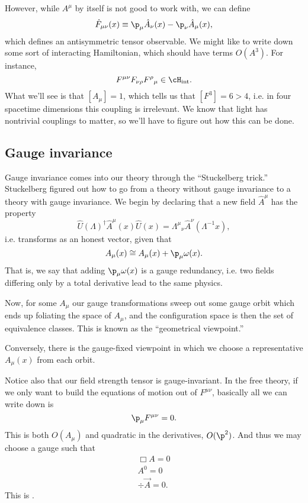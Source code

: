 However, while $A^\mu$ by itself is not good to work with, we can define
\begin{equation}
    \hat F_{\mu\nu}(x) \equiv \p_\mu \hat A_\nu(x) -\p_\nu \hat A_\mu(x),
\end{equation}
which defines an antisymmetric tensor observable. We might like to write down some sort of interacting Hamiltonian, which should have terms $O(A^3)$. For instance,
\begin{equation}
    F^{\mu\nu}F_{\nu\rho} F^\rho{}_\mu \in \cH_\text{int}.
\end{equation}
What we'll see is that $[A_\mu]=1$, which tells us that $[F^3]=6 >4$, i.e. in four spacetime dimensions this coupling is irrelevant. We know that light has nontrivial couplings to matter, so we'll have to figure out how this can be done.

\subsection*{Gauge invariance}
Gauge invariance comes into our theory through the ``Stuckelberg trick.'' Stuckelberg figured out how to go from a theory without gauge invariance to a theory with gauge invariance. We begin by declaring that a new field $\hat A^\mu$ has the property
\begin{equation}
    \hat U(\Lambda)^\dagger \hat A^\mu(x) \hat U(x) = \Lambda^\mu{}_\nu \hat A^\nu (\Lambda^{-1}x),
\end{equation}
i.e. transforms as an honest vector, given that
\begin{equation}
    A_\mu(x) \cong A_\mu(x) + \p_\mu \omega(x).
\end{equation}
That is, we say that adding $\p_\mu\omega(x)$ is a gauge redundancy, i.e. two fields differing only by a total derivative lead to the same physics.

Now, for some $A_\mu$ our gauge transformations sweep out some gauge orbit which ends up foliating the space of $A_\mu$, and the configuration space is then the set of equivalence classes. This is known as the ``geometrical viewpoint.''

Conversely, there is the gauge-fixed viewpoint in which we choose a representative $A_\mu(x)$ from each orbit.

Notice also that our field strength tensor is gauge-invariant. In the free theory, if we only want to build the equations of motion out of $F^{\mu\nu}$, basically all we can write down is
\begin{equation}
    \p_\mu F^{\mu\nu}=0.
\end{equation}
This is both $O(A_\mu)$ and quadratic in the derivatives, $O(\p^2)$. And thus we may choose a gauge such that
\begin{gather}
    \Box A =0\\
    A^0 = 0\\
    \div \vec{A}=0.
\end{gather}
This is .

